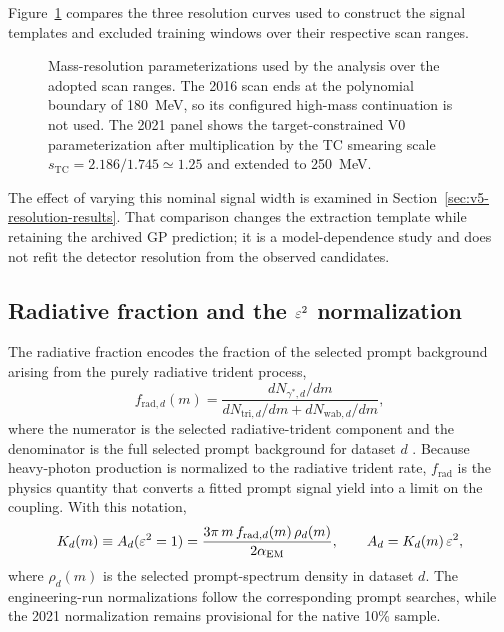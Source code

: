 Figure~\ref{fig:mass-resolution-three-panel} compares the three resolution curves used
to construct the signal templates and excluded training windows over their respective
scan ranges.

\begin{figure}[H]
\centering
{}
\caption{Mass-resolution parameterizations used by the analysis over the adopted
scan ranges. The 2016 scan ends at the polynomial boundary of \SI{180}{MeV}, so its
configured high-mass continuation is not used. The 2021 panel shows the target-constrained V0 parameterization after
multiplication by the TC smearing scale $s_{\mathrm{TC}}=2.186/1.745\simeq1.25$ and
extended to \SI{250}{MeV}.}
\label{fig:mass-resolution-three-panel}
\end{figure}

The effect of varying this nominal signal width is examined in
Section~\ref{sec:v5-resolution-results}. That comparison changes the extraction
template while retaining the archived GP prediction; it is a model-dependence
study and does not refit the detector resolution from the observed candidates.

\subsection{Radiative fraction and the \texorpdfstring{$\varepsilon^2$}{epsilon2} normalization}
\label{sec:radfrac}

The radiative fraction encodes the fraction of the selected prompt background arising
from the purely radiative trident process,
\begin{equation}
f_{\mathrm{rad},d}(m)
=
\frac{dN_{\gamma^\ast,d}/dm}{dN_{\mathrm{tri},d}/dm + dN_{\mathrm{wab},d}/dm},
\label{eq:frad-def}
\end{equation}
where the numerator is the selected radiative-trident component and the denominator is
the full selected prompt background for dataset $d$
\cite{HPS2015DarkPhoton,HPS2016PromptLong}. Because heavy-photon production is
normalized to the radiative trident rate, $f_{\mathrm{rad}}$ is the physics quantity
that converts a fitted prompt signal yield into a limit on the coupling. With this
notation,
\begin{equation}
K_d(m) \equiv A_d(\varepsilon^2 = 1)
= \frac{3\pi\,m\,f_{\mathrm{rad},d}(m)\,\rho_d(m)}{2\alpha_{\mathrm{EM}}},
\qquad
A_d = K_d(m)\,\varepsilon^2,
\label{eq:kd-radfrac}
\end{equation}
where $\rho_d(m)$ is the selected prompt-spectrum density in dataset $d$. The
engineering-run normalizations follow the corresponding prompt searches, while the 2021
normalization remains provisional for the native 10\% sample.

